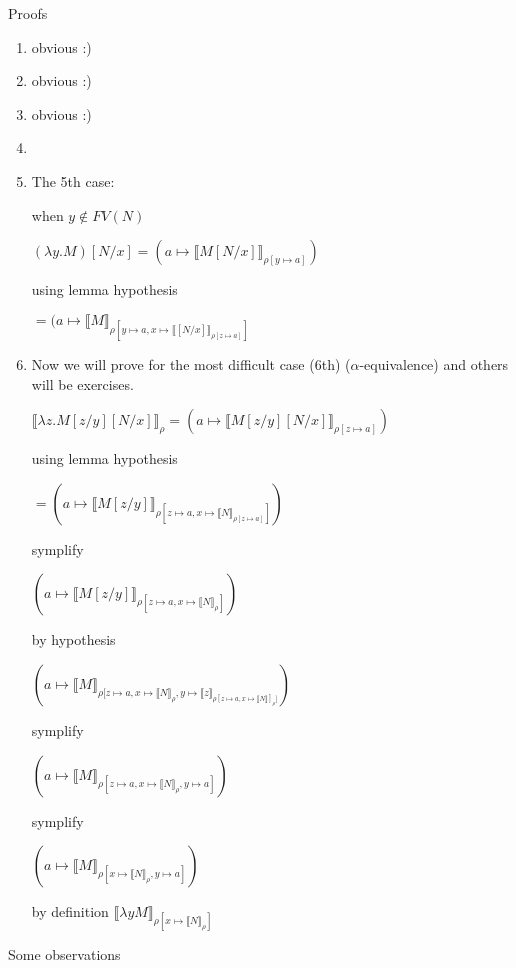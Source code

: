 \documentclass[a4paper,10pt]{book}
\begin{document}
Proofs
\begin{enumerate}
 \item obvious :)
 \item obvious :)
 \item obvious :)
 \item 
 \item The 5th case:

when $y \not\in FV(N)$

$(\lambda y . M)[N/x] = (a \mapsto \llbracket  M[N/x] \rrbracket_{\rho[y \mapsto a]})$

using lemma hypothesis

$ = (a \mapsto \llbracket M\rrbracket_{\rho[y \mapsto a, x \mapsto \llbracket [N/x] \rrbracket_{\rho[z \mapsto a] }]}$


\item 
Now we will prove for the most difficult case (6th) ($\alpha$-equivalence) and others will be exercises.

$\llbracket \lambda z . M[z/y][N/x]\rrbracket_\rho = (a \mapsto 
 \llbracket  M[z/y][N/x] \rrbracket_{\rho[z \mapsto a]})$

using lemma hypothesis
 
$ = (a \mapsto \llbracket M[z/y]\rrbracket_{\rho[z \mapsto a, x \mapsto \llbracket N \rrbracket_{\rho[z \mapsto a] }]})$

symplify

$(a \mapsto \llbracket M[z/y]\rrbracket_{\rho[z \mapsto a, x \mapsto \llbracket N \rrbracket_\rho ]})$

by hypothesis

$(a \mapsto \llbracket M\rrbracket_{\rho[z \mapsto a, x \mapsto \llbracket N \rrbracket_\rho,y \mapsto\llbracket z\rrbracket_{\rho[z \mapsto a, x \mapsto \llbracket N\rrbracket]_\rho ]}})$

symplify

$(a \mapsto \llbracket M\rrbracket_{\rho[z \mapsto a, x \mapsto \llbracket N \rrbracket_\rho,y \mapsto a]})$

symplify

$(a \mapsto \llbracket M\rrbracket_{\rho[         x \mapsto \llbracket N \rrbracket_\rho,y \mapsto a]})$

by definition
$\llbracket \lambda y M \rrbracket_{\rho[x \mapsto \llbracket N\rrbracket_\rho]}$

\end{enumerate}



Some observations
\end{document}
